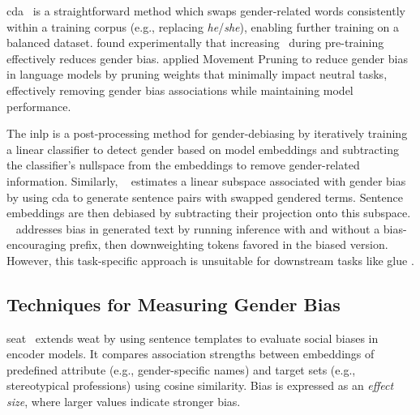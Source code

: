 \gls{cda}~\citep{cda, cda-orig} %
is a straightforward method which swaps gender-related words consistently within a training corpus (e.g., replacing \emph{he}/\emph{she}), enabling further training on a balanced dataset. %
\citet{dropout} found experimentally that increasing \dropout\ during pre-training effectively reduces gender bias.
\citet{movementPruning} applied Movement Pruning \cite{movementPruningOrig} to reduce gender bias in language models by pruning weights that minimally impact neutral tasks, effectively removing gender bias associations while maintaining model performance.

The \gls{inlp} \cite{inlp} is a post-processing method for gender-debiasing by iteratively training a linear classifier to detect gender based on model embeddings and subtracting the classifier's nullspace from the embeddings to remove gender-related information.
Similarly, \sentencedebias\ \cite{SentenceDebias} estimates a linear subspace associated with gender bias by using \gls{cda} to generate sentence pairs with swapped gendered terms. %
Sentence embeddings are then debiased by subtracting their projection onto this subspace.
\selfdebias~\cite{selfDebias} addresses bias in generated text by running inference with and without a bias-encouraging prefix, then downweighting tokens favored in the biased version. 
However, this task-specific approach is unsuitable for downstream tasks like \acrshort{glue} \cite{glue}.

\subsection{Techniques for Measuring Gender Bias} \label{sec:measuring-gender-bias}

\gls{seat}~\cite{seat} extends \gls{weat} \cite{weat} by using sentence templates to evaluate social biases in encoder models. It compares association strengths between embeddings of predefined attribute (e.g., gender-specific names) and target sets (e.g., stereotypical professions) using cosine similarity. 
Bias is expressed as an \emph{effect size}, where larger values indicate stronger bias. 

